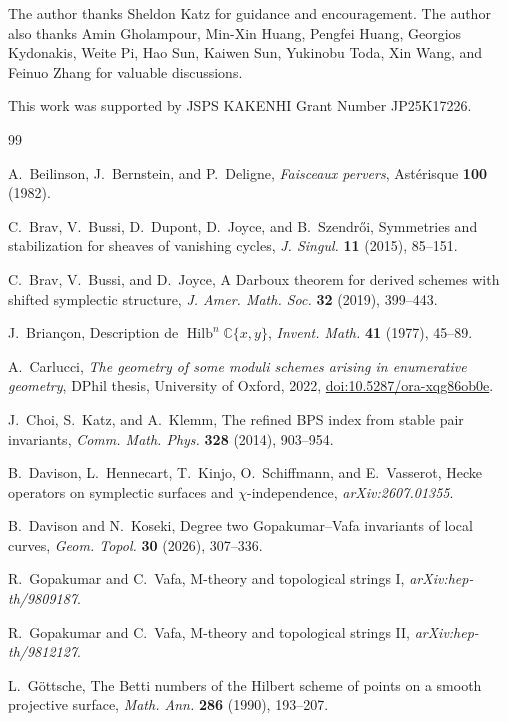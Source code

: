 \documentclass[11pt,reqno]{amsart}
\theoremstyle{definition}
\newcommand{\C}{\mathbb C}
\newcommand{\Hilb}{\operatorname{Hilb}}
\begin{document}
The author thanks Sheldon Katz for guidance and encouragement.  The author
also thanks Amin Gholampour, Min-Xin Huang, Pengfei Huang, Georgios Kydonakis, Weite Pi, Hao Sun,
Kaiwen Sun, Yukinobu Toda, Xin Wang, and Feinuo Zhang for valuable discussions. 

This work was supported by JSPS KAKENHI Grant Number JP25K17226.

\begin{thebibliography}{99}
\footnotesize
\raggedright

A.~Beilinson, J.~Bernstein, and P.~Deligne,
\emph{Faisceaux pervers}, Ast\'erisque \textbf{100} (1982).

C.~Brav, V.~Bussi, D.~Dupont, D.~Joyce, and B.~Szendr\H{o}i,
Symmetries and stabilization for sheaves of vanishing cycles,
\emph{J. Singul.} \textbf{11} (2015), 85--151.

C.~Brav, V.~Bussi, and D.~Joyce,
A Darboux theorem for derived schemes with shifted symplectic structure,
\emph{J. Amer. Math. Soc.} \textbf{32} (2019), 399--443.

J.~Brian\c{c}on,
Description de $\Hilb^n\C\{x,y\}$,
\emph{Invent. Math.} \textbf{41} (1977), 45--89.

A.~Carlucci,
\emph{The geometry of some moduli schemes arising in enumerative geometry},
DPhil thesis, University of Oxford, 2022,
\href{https://doi.org/10.5287/ora-xqg86ob0e}{doi:10.5287/ora-xqg86ob0e}.

J.~Choi, S.~Katz, and A.~Klemm,
The refined BPS index from stable pair invariants,
\emph{Comm. Math. Phys.} \textbf{328} (2014), 903--954.

B.~Davison, L.~Hennecart, T.~Kinjo, O.~Schiffmann, and E.~Vasserot,
Hecke operators on symplectic surfaces and $\chi$-independence,
\emph{arXiv:2607.01355}.

B.~Davison and N.~Koseki,
Degree two Gopakumar--Vafa invariants of local curves,
\emph{Geom. Topol.} \textbf{30} (2026), 307--336.

R.~Gopakumar and C.~Vafa,
M-theory and topological strings I,
\emph{arXiv:hep-th/9809187}.

R.~Gopakumar and C.~Vafa,
M-theory and topological strings II,
\emph{arXiv:hep-th/9812127}.

L.~G\"ottsche,
The Betti numbers of the Hilbert scheme of points on a smooth projective
surface,
\emph{Math. Ann.} \textbf{286} (1990), 193--207.


\end{thebibliography}
\end{document}

